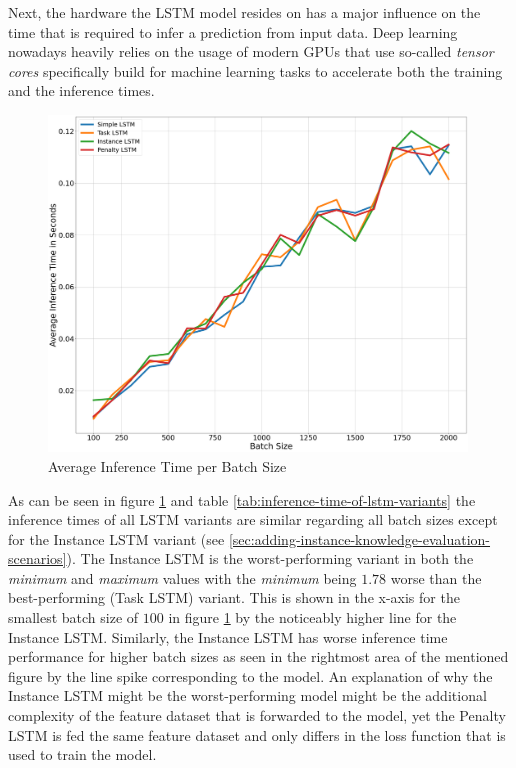     Next, the hardware the LSTM model resides on has a major influence on the time that is required to infer a prediction from input data. Deep learning nowadays heavily relies on the usage of modern GPUs that use so-called \emph{tensor cores} specifically build for machine learning tasks to accelerate both the training and the inference times.
    \begin{figure}
      \centering
      \caption{Average Inference Time per Batch Size}
      \label{fig:average-inference-time-per-batch-size}
      \includegraphics[width=0.99\textwidth]{figures/inference_time_batch_size.png}
    \end{figure}

    As can be seen in figure \ref{fig:average-inference-time-per-batch-size} and table \ref{tab:inference-time-of-lstm-variants} the inference times of all LSTM variants are similar regarding all batch sizes except for the Instance LSTM variant (see \ref{sec:adding-instance-knowledge-evaluation-scenarios}). 
    The Instance LSTM is the worst-performing variant in both the \emph{minimum} and \emph{maximum} values with the \emph{minimum} being $1.78$ worse than the best-performing (Task LSTM) variant. This is shown in the x-axis for the smallest batch size of $100$ in figure \ref{fig:average-inference-time-per-batch-size} by the noticeably higher line for the Instance LSTM.
    Similarly, the Instance LSTM has worse inference time performance for higher batch sizes as seen in the rightmost area of the mentioned figure by the line spike corresponding to the model.
    An explanation of why the Instance LSTM might be the worst-performing model might be the additional complexity of the feature dataset that is forwarded to the model, yet the Penalty LSTM is fed the same feature dataset and only differs in the loss function that is used to train the model.
    

